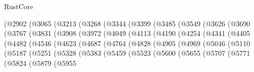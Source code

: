 \begin{lexlean}{RustCore}
\begin{coremodule}
            (@2902
              (@3065
                (@3213
                  (@3268
                    (@3344
                      (@3399
                        (@3485
                          (@3549
                            (@3626
                              (@3690
                                (@3767
                                  (@3831
                                    (@3908
                                      (@3972
                                        (@4049
                                          (@4113
                                            (@4190
                                              (@4254
                                                (@4341
                                                  (@4405
                                                    (@4482
                                                      (@4546
                                                        (@4623
                                                          (@4687
                                                            (@4764
                                                              (@4828
                                                                (@4905
                                                                  (@4969
                                                                    (@5046
                                                                      (@5110
                                                                        (@5187
                                                                          (@5251
                                                                            (@5328
                                                                              (@5383
                                                                                (@5459
                                                                                  (@5523
                                                                                    (@5600
                                                                                      (@5655
                                                                                        (@5707
                                                                                          (@5771
                                                                                            (@5824
                                                                                              (@5879
                                                                                                (@5955

\end{coremodule}
\end{lexlean}
